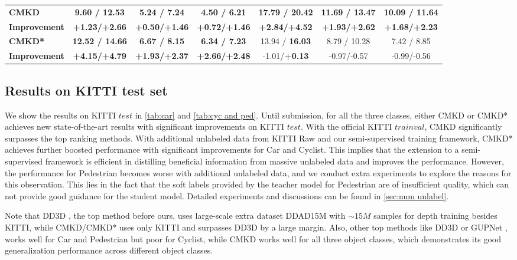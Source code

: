 \documentclass[runningheads]{llncs}
\begin{document}
\begin{table*}[t]
{\begin{tabular}{l|ccc|ccc}
    \midrule
    \textbf{CMKD}   & \textbf{9.60 / 12.53}  & \textbf{5.24 / 7.24}  & \textbf{4.50 / 6.21}  & \textbf{17.79 / 20.42}  & \textbf{11.69 / 13.47}  & \textbf{10.09 / 11.64}  \\
    \textbf{Improvement} &\textbf{+1.23/+2.66}  & \textbf{+0.50/+1.46}  &\textbf{+0.72/+1.46} &\textbf{+2.84/+4.52} &\textbf{+1.93/+2.62}  &\textbf{+1.68/+2.23} \\
    \midrule
    \textbf{CMKD*}   & \textbf{12.52 / 14.66}  & \textbf{6.67 / 8.15}  & \textbf{6.34 / 7.23}  & 13.94 / \textbf{16.03} & 8.79 / 10.28  & 7.42 / 8.85  \\
    \textbf{Improvement} & \textbf{+4.15/+4.79}  & \textbf{+1.93/+2.37}  &\textbf{+2.66/+2.48}  &-1.01/\textbf{+0.13}  &-0.97/-0.57  &-0.99/-0.56  \\
    \bottomrule
    \end{tabular}
    }
    \label{tab:cyc and ped}
\end{table*}


\subsection{Results on KITTI test set}
We show the results on KITTI $test$ in \cref{tab:car} and \cref{tab:cyc and ped}. 
Until submission, for all the three classes, either CMKD or CMKD* achieves new state-of-the-art results with significant improvements on KITTI $test$.
With the official KITTI $trainval$, CMKD significantly surpasses the top ranking methods. 
With additional unlabeled data from KITTI Raw and our semi-supervised training framework, CMKD* achieves further boosted performance with significant improvements for Car and Cyclist. This implies that the extension to a semi-supervised framework is efficient in distilling beneficial information from massive unlabeled data and improves the performance.
However, the performance for Pedestrian becomes worse with additional unlabeled data, and we conduct extra experiments to explore the reasons for this observation. 
This lies in the fact that the soft labels provided by the teacher model for Pedestrian are of insufficient quality, which can not provide good guidance for the student model.
Detailed experiments and discussions can be found in \cref{sec:num unlabel}.

Note that DD3D \cite{dd3d}, the top method before ours, uses large-scale extra dataset DDAD15M with $\sim15M$ samples for depth training besides KITTI, while CMKD/CMKD* uses only KITTI and surpasses DD3D by a large margin.
Also, other top methods like DD3D \cite{dd3d} or GUPNet \cite{gupnet}, works well for Car and Pedestrian but poor for Cyclist, while CMKD works well for all three object classes, which demonstrates its good generalization performance across different object classes. 
\end{document}
